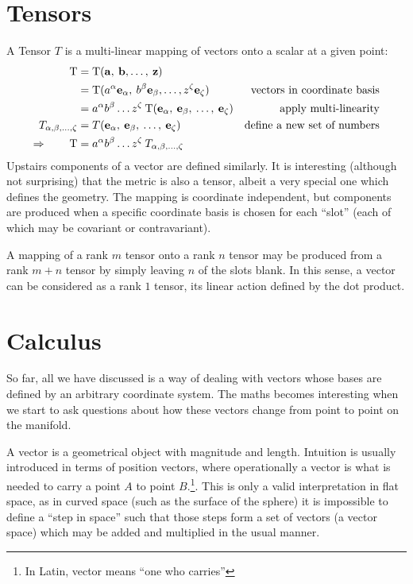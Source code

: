 \section{Tensors}
A Tensor $T$ is a multi-linear mapping of vectors onto a scalar at a given point:
\begin{align}
  \mathrm{T} 
  &= 
  \mathrm{T}(\mathbf{a},\:\mathbf{b},\ldots,\:\mathbf{z})
  &
  \nonumber
  \\
  &= 
  \mathrm{T}(a^\alpha\mathbf{e}_\alpha,\:b^\beta\mathbf{e}_\beta,\ldots,z^\zeta\mathbf{e}_\zeta)  
  &\text{vectors in coordinate basis}
  \nonumber
  \\
  &= 
  a^\alpha b^\beta \ldots z^\zeta \: 
  \mathrm{T}(\mathbf{e}_\alpha,\:\mathbf{e}_\beta,\:\ldots,\:\mathbf{e}_\zeta)  
  &\text{apply multi-linearity}
  \nonumber
  \\
  T_{\alpha,\beta,\ldots,\zeta} 
  &=  
  T(\mathbf{e}_\alpha,\:\mathbf{e}_\beta,\:\ldots,\:\mathbf{e}_\zeta)
  &\text{define a new set of numbers}
  \nonumber
  \\
  \Rightarrow\qquad
  \mathrm{T}
  &= 
  a^\alpha b^\beta \ldots z^\zeta \: 
  T_{\alpha,\beta,\ldots,\zeta}
  &
  \nonumber
\end{align}
Upstairs components of a vector are defined similarly. It is interesting (although not surprising) that the metric is also a tensor, albeit a very special one which defines the geometry. The mapping is coordinate independent, but components are produced when a specific coordinate basis is chosen for each ``slot'' (each of which may be covariant or contravariant).

A mapping of a rank $m$ tensor onto a rank $n$ tensor may be produced from a rank $m+n$ tensor by simply leaving $n$ of the slots blank. In this sense, a vector can be considered as a rank $1$ tensor, its linear action defined by the dot product.

\section{Calculus}
So far, all we have discussed is a way of dealing with vectors whose bases are defined by an arbitrary coordinate system. The maths becomes interesting when we start to ask questions about how these vectors change from point to point on the manifold.


A vector is a geometrical object with magnitude and length. Intuition is usually introduced in terms of position vectors, where operationally a vector is what is needed to carry a point $A$ to point $B$.\footnote{In Latin, vector means ``one who carries''}. This is only a valid interpretation in flat space, as in curved space (such as the surface of the sphere) it is impossible to define a ``step in space'' such that those steps form a set of vectors (a vector space) which may be added and multiplied in the usual manner. 

